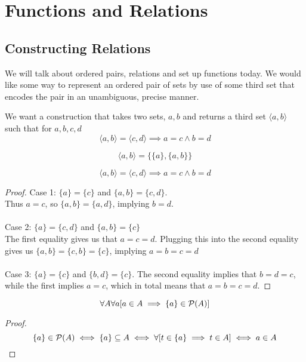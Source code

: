 
\section{Functions and Relations}
\subsection{Constructing Relations}
We will talk about ordered pairs, relations and set up functions today. We would like some way to represent an ordered pair of sets by use of some third set that encodes the pair in an unambiguous, precise manner.
\begin{rem}
We want a construction that takes two sets, $a, b$ and returns a third set $\langle a, b\rangle$ such that for $a, b, c, d$
\[\langle a, b\rangle = \langle c, d\rangle \implies a = c \wedge b = d\]
\end{rem}
\begin{defn}
\[\langle a, b\rangle = \{\{a\}, \{a, b\}\}\]
\end{defn}
\begin{prop}
\[\langle a, b\rangle = \langle c, d\rangle \implies a = c \wedge b = d\]
\end{prop}
\begin{proof}
Case 1: $\{a\} = \{c\}$ and $\{a, b\} = \{c, d\}$.\\
Thus $a = c$, so $\{a, b\} = \{a, d\}$, implying $b = d$.\\\\
Case 2: $\{a\} = \{c, d\}$ and $\{a, b\} = \{c\}$\\
The first equality gives us that $a = c = d$. Plugging this into the second equality gives us $\{a, b\} = \{c, b\} = \{c\}$, implying $a = b = c = d$\\\\
Case 3: $\{a\} = \{c\}$ and $\{b, d\} = \{c\}$. The second equality implies that $b = d = c$, while the first implies $a = c$, which in total means that $a = b = c = d$.
\end{proof}
\begin{prop}
\[\forall A \forall a [a \in A \implies \{a\} \in \P(A)]\]
\end{prop}
\begin{proof}
\[\{a\} \in \P(A) \iff \{a\} \subseteq A \iff \forall [t \in \{a\} \implies t \in A] \iff a \in A\]
\end{proof}
